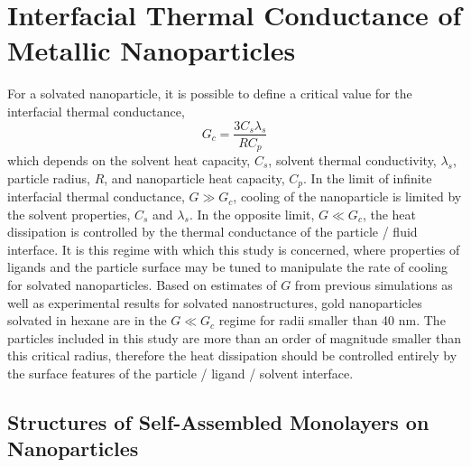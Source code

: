 \section{Interfacial Thermal Conductance of Metallic Nanoparticles}

For a solvated nanoparticle, it is possible to define a critical value
for the interfacial thermal conductance,
\begin{equation}
G_c = \frac{3 C_s \lambda_s}{R C_p}
\end{equation}
which depends on the solvent heat capacity, $C_s$, solvent thermal
conductivity, $\lambda_s$, particle radius, $R$, and nanoparticle heat
capacity, $C_p$.\cite{Wilson:2002uq} In the limit of infinite
interfacial thermal conductance, $G \gg G_c$, cooling of the
nanoparticle is limited by the solvent properties, $C_s$ and
$\lambda_s$.  In the opposite limit, $G \ll G_c$, the heat dissipation
is controlled by the thermal conductance of the particle / fluid
interface. It is this regime with which this study is concerned, where
properties of ligands and the particle surface may be tuned to
manipulate the rate of cooling for solvated nanoparticles.  Based on
estimates of $G$ from previous simulations as well as experimental
results for solvated nanostructures, gold nanoparticles solvated in
hexane are in the $G \ll G_c$ regime for radii smaller than 40 nm. The
particles included in this study are more than an order of magnitude
smaller than this critical radius, therefore the heat dissipation should be
controlled entirely by the surface features of the particle / ligand /
solvent interface.

\subsection{Structures of Self-Assembled Monolayers on Nanoparticles}


